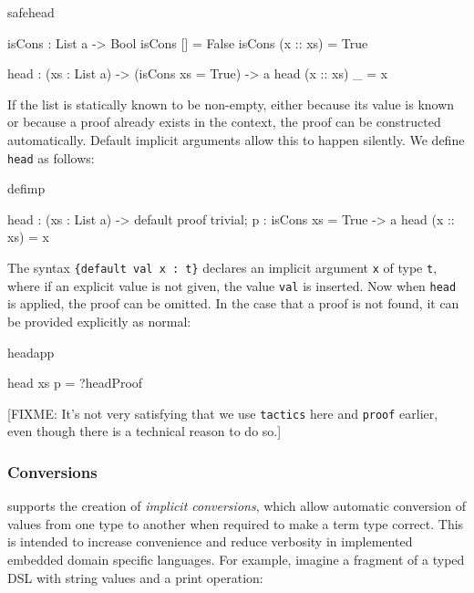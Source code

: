 \begin{SaveVerbatim}{safehead}

isCons : List a -> Bool
isCons [] = False
isCons (x :: xs) = True

head : (xs : List a) -> (isCons xs = True) -> a
head (x :: xs) _ = x

\end{SaveVerbatim}

\noindent
If the list is statically known to be non-empty, either because its value is
known or because a proof already exists in the context, the proof can be
constructed automatically. 
Default implicit arguments allow this to happen silently. We define
\texttt{head} as follows:

\begin{SaveVerbatim}{defimp}

head : (xs : List a) -> 
       {default proof { trivial; } 
            p : isCons xs = True} -> a
head (x :: xs) = x

\end{SaveVerbatim}

\noindent
The syntax \texttt{\{default val x : t\}} declares an implicit argument
\texttt{x} of type \texttt{t}, where if an explicit value is not given,
the value \texttt{val} is inserted.
Now when \texttt{head} is applied, the proof can be omitted. In the case that a
proof is not found, it can be provided explicitly as normal:

\begin{SaveVerbatim}{headapp}

head xs {p = ?headProof} 

\end{SaveVerbatim}

[FIXME: It's not very satisfying that we use \texttt{tactics} here and
\texttt{proof} earlier, even though there is a technical reason to do so.]

\subsubsection{Conversions}

\Idris{} supports the creation of \emph{implicit conversions}, which allow
automatic conversion of values from one type to another when required to make
a term type correct. This is intended to increase convenience and reduce
verbosity in implemented embedded domain specific languages. 
For example, imagine a fragment of a typed DSL with string values and
a print operation:

